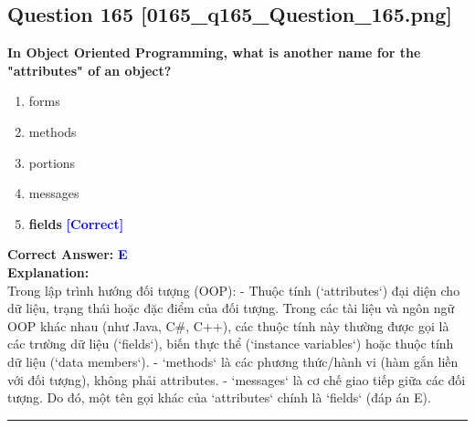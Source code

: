 \documentclass[11pt,a4paper]{article}
\begin{document}
\begin{minipage}{\textwidth}
\subsection*{Question 165 \quad \footnotesize{[0165_q165_Question_165.png]}}
\noindent \textbf{In Object Oriented Programming, what is another name for the "attributes" of an object?}

\begin{enumerate}[label=\Alph*.]
    \item forms
    \item methods
    \item portions
    \item messages
    \item \textbf{fields} \hfill \textcolor{blue}{\textbf{[Correct]}}
\end{enumerate}

\noindent \textbf{Correct Answer:} \textcolor{blue}{\textbf{E}} \\[4pt]
\noindent \textbf{Explanation:}\\
Trong lập trình hướng đối tượng (OOP):\newline
- Thuộc tính (`attributes`) đại diện cho dữ liệu, trạng thái hoặc đặc điểm của đối tượng. Trong các tài liệu và ngôn ngữ OOP khác nhau (như Java, C#, C++), các thuộc tính này thường được gọi là các trường dữ liệu (`fields`), biến thực thể (`instance variables`) hoặc thuộc tính dữ liệu (`data members`).\newline
- `methods` là các phương thức/hành vi (hàm gắn liền với đối tượng), không phải attributes.\newline
- `messages` là cơ chế giao tiếp giữa các đối tượng.\newline
Do đó, một tên gọi khác của `attributes` chính là `fields` (đáp án E).
\end{minipage}
\vspace{0.8cm}
\hrule
\vspace{0.5cm}
\end{document}
